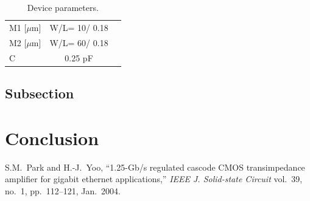 \documentclass[english, a4paper, 10pt]{ieej-tec}
\begin{document}
\begin{table}[b]
  \centering
  \caption{Device parameters.} \label{table1}
  \begin{tabular}{lcr}  
  \hline
    M1 [$\mu$m]  & W/L= 10/ 0.18\\
    M2 [$\mu$m]  & W/L= 60/ 0.18\\
    C				    & 0.25 pF\\ \hline
  \end{tabular}
\end{table}

\subsection{Subsection}

\section{Conclusion}

\begin{thebibliography}{9}
S.M.\ Park and H.-J.\ Yoo, ``1.25-Gb/s regulated cascode CMOS transimpedance amplifier for gigabit ethernet applications,''
{\em IEEE J. Solid-state Circuit} vol.\ 39, no.\ 1, pp.\ 112--121, Jan.\ 2004.
\end{thebibliography}
\end{document}
